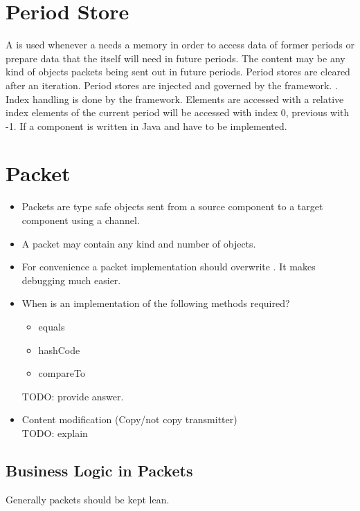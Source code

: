 \section{Period Store}
\label{subsec:peristor}

A  is used whenever a  needs a memory in order to access data of former periods or prepare data that the  itself will need in future periods. The content may be any kind of objects \eg packets being sent out in future periods. Period stores are cleared after an iteration. Period stores are injected and governed by the framework. . Index handling is done by the framework. Elements are accessed with a relative index \eg elements of the current period will be accessed with index 0, previous with -1. If a component is written in Java  and  have to be implemented.


\section{Packet}
\label{subsec:packet}

\begin{itemize}
  \item Packets are type safe objects sent from a source component to a target component using a channel.
  \item A packet may contain any kind and number of objects.
  \item For convenience a packet implementation should overwrite . It makes debugging much easier.
  \item When is an implementation of the following methods required?
  \begin{itemize}
    \item equals
    \item hashCode
    \item compareTo
  \end{itemize}
  TODO: provide answer.
  \item Content modification (Copy/not copy transmitter)\\
  TODO: explain
  
\end{itemize}

\subsection*{Business Logic in Packets}
Generally packets should be kept lean. 

